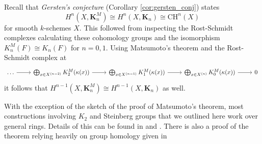 Recall that \emph{Gersten's conjecture} (Corollary \ref{cor:gersten_conj}) states
\[
    H^n(X, \mathbf{K}_n^M) \cong H^n(X, \mathbf{K}_n) \cong \mathrm{CH}^n(X)
\]
for smooth $k$-schemes $X$. This followed from inspecting the Rost-Schmidt complexes calculating these cohomology groups and the isomorphism $K_n^M(F) \cong K_n(F)$ for $n = 0, 1$. Using Matsumoto's theorem and the Rost-Schmidt complex at
\[
    \begin{tikzcd}
        \arrow[from=1-1, to=1-2]
        \arrow[from=1-2, to=1-3]
        \arrow[from=1-3, to=1-4]
        \arrow[from=1-4, to=1-5]
        \ldots & \bigoplus_{x \in X^{(n - 2)}} K_2^M(\kappa(x)) & \bigoplus_{x \in X^{(n - 1)}} K_1^M(\kappa(x)) & \bigoplus_{x \in X^{(n)}} K_0^M(\kappa(x)) & 0
    \end{tikzcd}
\]
it follows that $H^{n - 1}(X, \mathbf{K}_n^M) \cong H^{n - 1}(X, \mathbf{K}_n)$ as well.

With the exception of the sketch of the proof of Matsumoto's theorem, most constructions involving $K_2$ and Steinberg groups that we outlined here work over general rings. Details of this can be found in \cite{Kbook} and \cite{MilnorK}. There is also a proof of the theorem relying heavily on group homology given in \cite{Hutchinson}
